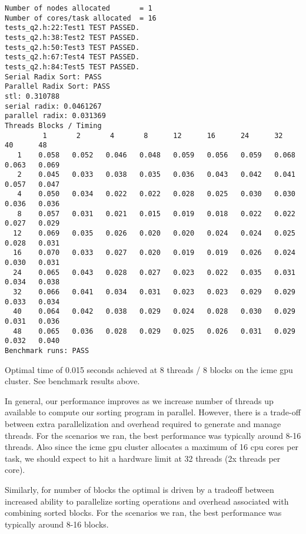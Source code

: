 \documentclass[12pt,letterpaper,twoside]{article}
\begin{document}
\begin{itemize}
\begin{verbatim}
Number of nodes allocated		= 1
Number of cores/task allocated 	= 16
tests_q2.h:22:Test1	TEST PASSED.
tests_q2.h:38:Test2	TEST PASSED.
tests_q2.h:50:Test3	TEST PASSED.
tests_q2.h:67:Test4	TEST PASSED.
tests_q2.h:84:Test5	TEST PASSED.
Serial Radix Sort: PASS
Parallel Radix Sort: PASS
stl: 0.310788
serial radix: 0.0461267
parallel radix: 0.031369
Threads Blocks / Timing
         1       2       4       8      12      16      24      32      40      48
   1    0.058   0.052   0.046   0.048   0.059   0.056   0.059   0.068   0.063   0.069
   2    0.045   0.033   0.038   0.035   0.036   0.043   0.042   0.041   0.057   0.047
   4    0.050   0.034   0.022   0.022   0.028   0.025   0.030   0.030   0.036   0.036
   8    0.057   0.031   0.021   0.015   0.019   0.018   0.022   0.022   0.027   0.029
  12    0.069   0.035   0.026   0.020   0.020   0.024   0.024   0.025   0.028   0.031
  16    0.070   0.033   0.027   0.020   0.019   0.019   0.026   0.024   0.030   0.031
  24    0.065   0.043   0.028   0.027   0.023   0.022   0.035   0.031   0.034   0.038
  32    0.066   0.041   0.034   0.031   0.023   0.023   0.029   0.029   0.033   0.034
  40    0.064   0.042   0.038   0.029   0.024   0.028   0.030   0.029   0.031   0.036
  48    0.065   0.036   0.028   0.029   0.025   0.026   0.031   0.029   0.032   0.040
Benchmark runs: PASS
\end{verbatim} 
    
    Optimal time of 0.015 seconds achieved at 8 threads / 8 blocks on the icme gpu cluster.
    See benchmark results above.

    In general, our performance improves as we increase number of threads up available to 
    compute our sorting program in parallel. However, there is a trade-off between extra 
    parallelization and overhead required to generate and manage threads. For the scenarios
    we ran, the best performance was typically around 8-16 threads. Also since the icme gpu 
    cluster allocates a maximum of 16 cpu cores per task, we should expect to hit
    a hardware limit at 32 threads (2x threads per core). 
    
    Similarly, for number of blocks the optimal is driven by a tradeoff between increased 
    ability to parallelize sorting operations and overhead associated with combining sorted 
    blocks. For the scenarios we ran, the best performance was typically around 8-16 blocks.

\end{itemize}
\end{document}
